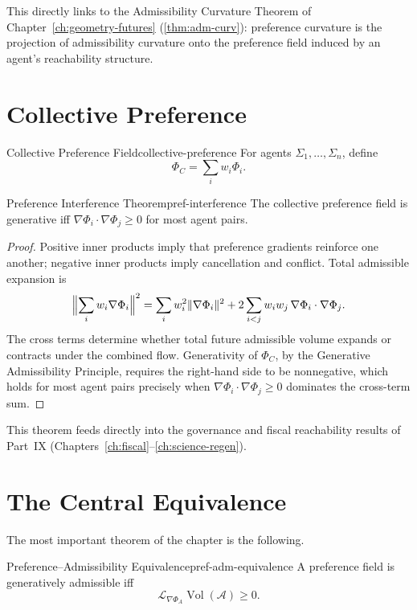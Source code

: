 \documentclass[12pt,twoside,openright]{book}
\newcommand{\adm}{\mathcal{A}}
\newcommand{\Vol}{\operatorname{Vol}}
\begin{document}
This directly links to the Admissibility Curvature Theorem
of Chapter~\ref{ch:geometry-futures}
(\cref{thm:adm-curv}): preference curvature is the
projection of admissibility curvature onto the preference
field induced by an agent's reachability structure.

\section{Collective Preference}
\label{sec:ch22-collective}

\begin{definition}{Collective Preference Field}{collective-preference}
  For agents $\Sigma_1, \ldots, \Sigma_n$, define
  \[
    \Phi_C = \sum_i w_i \Phi_i.
  \]
\end{definition}

\begin{theorem}{Preference Interference Theorem}{pref-interference}
  The collective preference field is generative iff
  $\nabla\Phi_i \cdot \nabla\Phi_j \ge 0$ for most agent
  pairs.
\end{theorem}

\begin{proof}
  Positive inner products imply that preference gradients
  reinforce one another; negative inner products imply
  cancellation and conflict. Total admissible expansion is
  \[
    \Bigl\|\sum_i w_i \nabla\Phi_i\Bigr\|^2
    = \sum_i w_i^2 \|\nabla\Phi_i\|^2
      + 2\sum_{i<j} w_i w_j\, \nabla\Phi_i \cdot \nabla\Phi_j.
  \]
  The cross terms determine whether total future admissible
  volume expands or contracts under the combined flow.
  Generativity of $\Phi_C$, by the Generative Admissibility
  Principle, requires the right-hand side to be
  nonnegative, which holds for most agent pairs precisely
  when $\nabla\Phi_i \cdot \nabla\Phi_j \ge 0$ dominates the
  cross-term sum.
\end{proof}

This theorem feeds directly into the governance and fiscal
reachability results of Part~IX
(Chapters~\ref{ch:fiscal}--\ref{ch:science-regen}).

\section{The Central Equivalence}
\label{sec:ch22-equivalence}

The most important theorem of the chapter is the following.

\begin{theorem}{Preference--Admissibility Equivalence}{pref-adm-equivalence}
  A preference field is generatively admissible iff
  \[
    \mathcal{L}_{\nabla\Phi_A} \Vol(\adm) \ge 0.
  \]
\end{theorem}
\end{document}
